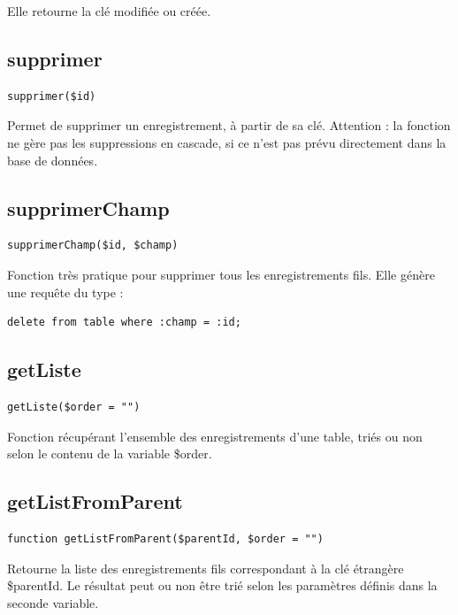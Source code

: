 Elle retourne la clé modifiée ou créée.

\subsection{supprimer}

\begin{lstlisting}
supprimer($id)
\end{lstlisting}

Permet de supprimer un enregistrement, à partir de sa clé. Attention : la fonction ne gère pas les suppressions en cascade, si ce n'est pas prévu directement dans la base de données.

\subsection{supprimerChamp}

\begin{lstlisting}
supprimerChamp($id, $champ)
\end{lstlisting}

Fonction très pratique pour supprimer tous les enregistrements fils. Elle génère une requête du type :
\begin{lstlisting}
delete from table where :champ = :id;
\end{lstlisting}


\subsection{getListe}

\begin{lstlisting}
getListe($order = "")
\end{lstlisting}

Fonction récupérant l'ensemble des enregistrements d'une table, triés ou non selon le contenu de la variable \$order.

\subsection{getListFromParent}

\begin{lstlisting}
function getListFromParent($parentId, $order = "")
\end{lstlisting}

Retourne la liste des enregistrements fils correspondant à la clé étrangère \$parentId. Le résultat peut ou non être trié selon les paramètres définis dans la seconde variable.

